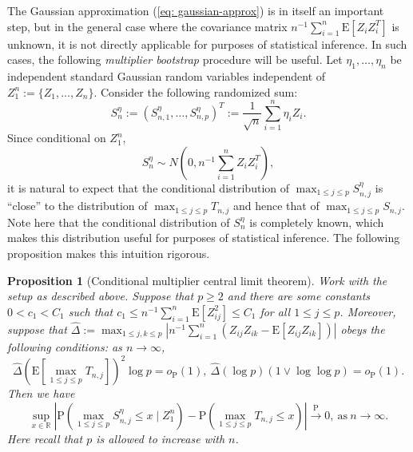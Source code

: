 \documentclass[11pt,reqno]{amsart}
\newtheorem{proposition}{Proposition}
\theoremstyle{definition}
\renewcommand{\hat}{\widehat}
\newcommand{\Ep}{{\mathrm{E}}}
\renewcommand{\Pr}{{\mathrm{P}}}
\newcommand{\RR}{\mathbb{R}}
\begin{document}
The Gaussian approximation (\ref{eq: gaussian-approx}) is in itself an important step, but in the general case where the covariance matrix $n^{-1} \sum_{i=1}^{n} \Ep [ Z_{i} Z_{i}^{T} ]$ is unknown, it is not directly applicable for purposes of statistical inference. In such cases, the following {\em multiplier bootstrap} procedure will be useful. Let $\eta_{1},\dots,\eta_{n}$ be independent standard Gaussian random variables independent of $Z_{1}^{n} := \{ Z_{1},\dots,Z_{n} \}$. Consider the following randomized sum:
\begin{equation*}
S_{n}^{\eta} := (S_{n,1}^{\eta}, \dots, S_{n,p}^{\eta} )^{T} := \frac{1}{\sqrt{n}} \sum_{i=1}^{n} \eta_{i} Z_{i}.
\end{equation*}
Since conditional on $Z_{1}^{n}$,
\begin{equation*}
S_{n}^{\eta} \sim N(0,n^{-1} {\textstyle \sum}_{i=1}^{n} Z_{i}Z_{i}^{T}),
\end{equation*}
it is natural to expect that the conditional distribution of $\max_{1 \leq j \leq p} S_{n,j}^{\eta}$ is ``close'' to the distribution of $\max_{1 \leq j \leq p} T_{n,j}$ and hence that of $\max_{1 \leq j \leq p} S_{n,j}$. Note here that the conditional distribution of $S^{\eta}_{n}$ is completely known, which makes this distribution useful for purposes of statistical inference. The following proposition makes this intuition rigorous.

\begin{proposition}[Conditional multiplier central limit theorem]
\label{prop: multiplier bootstrap}
Work with the setup as described above. Suppose that $p \geq 2$ and  there are some constants $0 < c_{1} < C_{1}$ such that
$c_{1} \leq n^{-1} \sum_{i=1}^{n} \Ep [ Z_{ij}^{2} ] \leq C_{1}$ for all $1 \leq j \leq p$. Moreover, suppose that  $\hat{\Delta} := \max_{1 \leq j,k \leq p} | n^{-1} \sum_{i=1}^{n} (Z_{ij}Z_{ik} - \Ep [ Z_{ij}Z_{ik} ])|$ obeys the following conditions: as $n \to \infty$,
\begin{equation}
\hat{\Delta} ( \Ep [\max_{1 \leq j \leq p} T_{n,j}] )^{2} \log p = o_{\Pr}(1), \ \hat{\Delta} (\log p) (1 \vee \log \log p)= o_{\Pr}(1). \label{eq: growth}
\end{equation}
Then we have
\begin{equation}
\sup_{x \in \RR} | \Pr ( \max_{1 \leq j \leq p} S_{n,j}^{\eta} \leq x \mid Z_{1}^{n} ) - \Pr ( \max_{1 \leq j \leq p} T_{n,j} \leq x ) | \stackrel{\Pr}{\to} 0, \ \text{as} \ n \to \infty. \label{eq: cmclt}
\end{equation}
Here recall that $p$ is allowed to increase with $n$.
\end{proposition}
\end{document}
